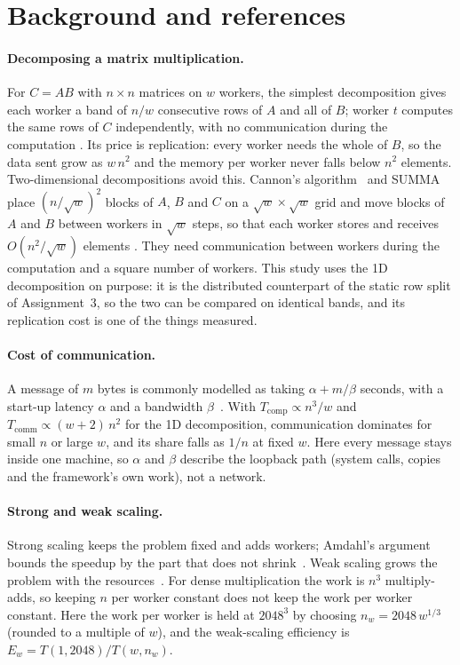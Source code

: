 \documentclass[11pt,a4paper]{article}
\begin{document}
\section{Background and references}
\label{sec:background}

\paragraph{Decomposing a matrix multiplication.} For $C=AB$ with $n\times n$
matrices on $w$ workers, the simplest decomposition gives each worker a band of
$n/w$ consecutive rows of $A$ and all of $B$; worker $t$ computes the same rows
of $C$ independently, with no communication during the computation
\cite[ch.~8]{grama2003}. Its price is replication: every worker needs the whole
of $B$, so the data sent grow as $w\,n^2$ and the memory per worker never falls
below $n^2$ elements. Two-dimensional decompositions avoid this. Cannon's
algorithm~\cite{cannon1969} and SUMMA~\cite{vandegeijn1997} place
$(n/\sqrt{w})^2$ blocks of $A$, $B$ and $C$ on a $\sqrt{w}\times\sqrt{w}$ grid and
move blocks of $A$ and $B$ between workers in $\sqrt{w}$ steps, so that each
worker stores and receives $O(n^2/\sqrt{w})$ elements \cite[ch.~8]{grama2003}.
They need communication between workers during the computation and a square
number of workers. This study uses the 1D decomposition on purpose: it is the
distributed counterpart of the static row split of Assignment~3, so the two can
be compared on identical bands, and its replication cost is one of the things
measured.

\paragraph{Cost of communication.} A message of $m$ bytes is commonly modelled
as taking $\alpha + m/\beta$ seconds, with a start-up latency $\alpha$ and a
bandwidth $\beta$~\cite{hockney1994}. With $T_\mathrm{comp}\propto n^3/w$ and
$T_\mathrm{comm}\propto (w+2)\,n^2$ for the 1D decomposition, communication
dominates for small $n$ or large $w$, and its share falls as $1/n$ at fixed $w$.
Here every message stays inside one machine, so $\alpha$ and $\beta$ describe
the loopback path (system calls, copies and the framework's own work), not a
network.

\paragraph{Strong and weak scaling.} Strong scaling keeps the problem fixed
and adds workers; Amdahl's argument bounds the speedup by the part that does
not shrink~\cite{amdahl1967}. Weak scaling grows the problem with the
resources~\cite{gustafson1988}. For dense multiplication the work is $n^3$
multiply-adds, so keeping $n$ per worker constant does not keep the work per
worker constant. Here the work per worker is held at $2048^3$ by choosing
$n_w=2048\,w^{1/3}$ (rounded to a multiple of $w$), and the weak-scaling
efficiency is $E_w=T(1,2048)/T(w,n_w)$.
\end{document}
